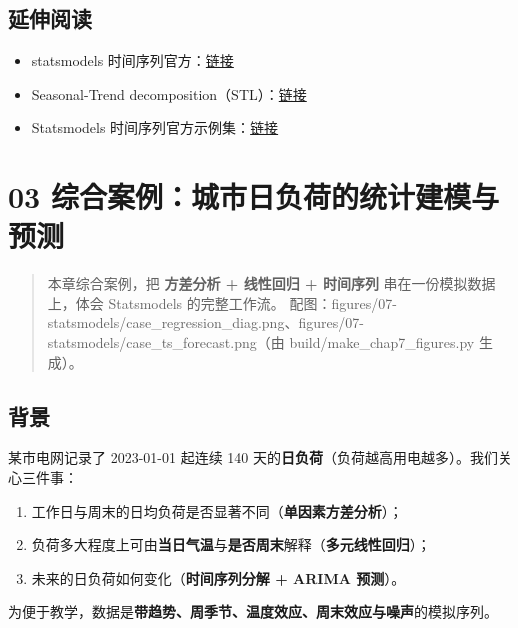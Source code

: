\subsection{延伸阅读}\label{ux5ef6ux4f38ux9605ux8bfb-32}

\begin{itemize}
\tightlist
\item
  statsmodels
  时间序列官方：\href{https://www.statsmodels.org/stable/tsa.html}{链接}
\item
  Seasonal-Trend
  decomposition（STL）：\href{https://www.statsmodels.org/devel/examples/notebooks/generated/stl_decomposition.html}{链接}
\item
  Statsmodels
  时间序列官方示例集：\href{https://www.statsmodels.org/stable/examples/index.html\#time-series}{链接}
\end{itemize}

\section{03
综合案例：城市日负荷的统计建模与预测}\label{ux7efcux5408ux6848ux4f8bux57ceux5e02ux65e5ux8d1fux8377ux7684ux7edfux8ba1ux5efaux6a21ux4e0eux9884ux6d4b}

\begin{quote}
本章综合案例，把 \textbf{方差分析 + 线性回归 + 时间序列}
串在一份模拟数据上，体会 Statsmodels 的完整工作流。
配图：figures/07-statsmodels/case\_regression\_diag.png、figures/07-statsmodels/case\_ts\_forecast.png（由
build/make\_chap7\_figures.py 生成）。
\end{quote}

\subsection{背景}\label{ux80ccux666f-6}

某市电网记录了 2023-01-01 起连续 140
天的\textbf{日负荷}（负荷越高用电越多）。我们关心三件事：

\begin{enumerate}
\def\labelenumi{\arabic{enumi}.}
\tightlist
\item
  工作日与周末的日均负荷是否显著不同（\textbf{单因素方差分析}）；
\item
  负荷多大程度上可由\textbf{当日气温}与\textbf{是否周末}解释（\textbf{多元线性回归}）；
\item
  未来的日负荷如何变化（\textbf{时间序列分解 + ARIMA 预测}）。
\end{enumerate}

为便于教学，数据是\textbf{带趋势、周季节、温度效应、周末效应与噪声}的模拟序列。

